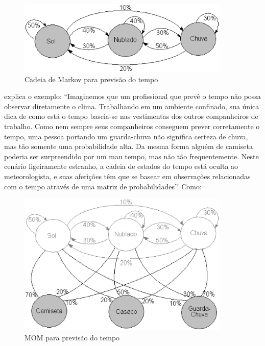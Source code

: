 \begin{figure}[H]
\includegraphics[width=0.9\textwidth]{graficos/markov.eps}
\caption{Cadeia de Markov para previsão do tempo}
\label{Modelos Ocultos de Markov}
\end{figure}

 explica o exemplo:
“Imaginemos que um profissional que prevê o tempo não possa observar diretamente o clima. Trabalhando em um ambiente confinado, sua única dica de como está o tempo baseia-se nas vestimentas dos outros companheiros de trabalho. Como nem sempre seus companheiros conseguem prever corretamente o tempo, uma pessoa portando um guarda-chuva não significa certeza de chuva, mas tão somente uma probabilidade alta. Da mesma forma alguém de camiseta poderia ser surpreendido por um mau tempo, mas não tão frequentemente. Neste cenário ligeiramente estranho, a cadeia de estados do tempo está oculta ao meteorologista, e suas aferições têm que se basear em observações relacionadas com o tempo através de uma matriz de probabilidades”. Como:

\begin{figure}[H]
\includegraphics[width=0.9\textwidth]{graficos/markov_2.eps}
\caption{MOM para previsão do tempo}
\label{Modelos Ocultos de Markov}
\end{figure}

